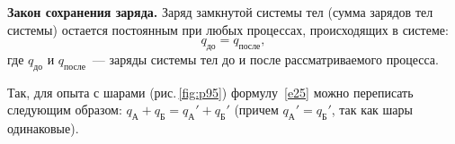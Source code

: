 \documentclass[main.tex]{subfiles}
\begin{document}
%
\begin{law}
    \textbf{Закон сохранения заряда.} Заряд замкнутой системы тел (сумма зарядов тел системы) остается постоянным при любых процессах, происходящих в системе:
    \begin{equation}
        \label{e25}
        q_\text{до}=q_\text{после},
    \end{equation}
    где $q_\text{до}$ и $q_\text{после}$~--- заряды системы тел до и после рассматриваемого процесса.
\end{law}
%
Так, для опыта с шарами (рис.\,\ref{fig:p95}) формулу~\eqref{e25} можно переписать следующим образом: $q_\text{А}^{\phantom{'}}+q_\text{Б}^{\phantom{'}}=q_\text{А}'+q_\text{Б}'$ (причем $q_\text{А}'=q_\text{Б}'$, так как шары одинаковые).








\end{document}
